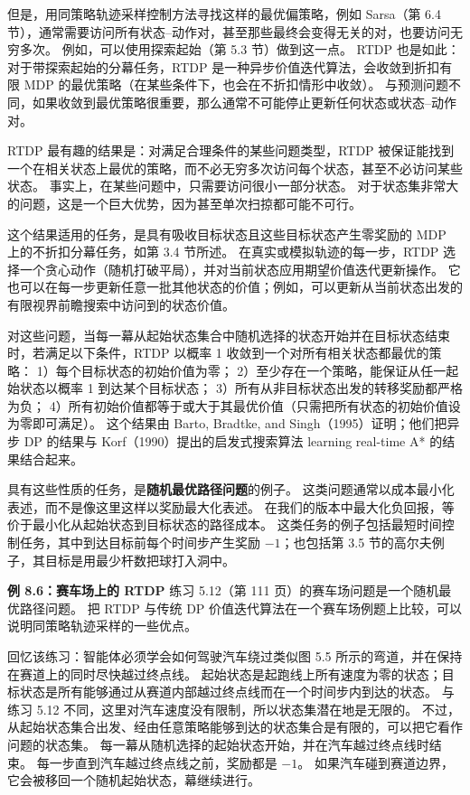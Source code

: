 \documentclass[UTF8, 12pt, fontset=fandol, oneside]{ctexart}
\begin{document}
但是，用同策略轨迹采样控制方法寻找这样的最优偏策略，例如 Sarsa（第 6.4 节），通常需要访问所有状态--动作对，甚至那些最终会变得无关的对，也要访问无穷多次。
例如，可以使用探索起始（第 5.3 节）做到这一点。
RTDP 也是如此：对于带探索起始的分幕任务，RTDP 是一种异步价值迭代算法，会收敛到折扣有限 MDP 的最优策略（在某些条件下，也会在不折扣情形中收敛）。
与预测问题不同，如果收敛到最优策略很重要，那么通常不可能停止更新任何状态或状态--动作对。

RTDP 最有趣的结果是：对满足合理条件的某些问题类型，RTDP 被保证能找到一个在相关状态上最优的策略，而不必无穷多次访问每个状态，甚至不必访问某些状态。
事实上，在某些问题中，只需要访问很小一部分状态。
对于状态集非常大的问题，这是一个巨大优势，因为甚至单次扫掠都可能不可行。

这个结果适用的任务，是具有吸收目标状态且这些目标状态产生零奖励的 MDP 上的不折扣分幕任务，如第 3.4 节所述。
在真实或模拟轨迹的每一步，RTDP 选择一个贪心动作（随机打破平局），并对当前状态应用期望价值迭代更新操作。
它也可以在每一步更新任意一批其他状态的价值；例如，可以更新从当前状态出发的有限视界前瞻搜索中访问到的状态价值。

对这些问题，当每一幕从起始状态集合中随机选择的状态开始并在目标状态结束时，若满足以下条件，RTDP 以概率 1 收敛到一个对所有相关状态都最优的策略：
1）每个目标状态的初始价值为零；
2）至少存在一个策略，能保证从任一起始状态以概率 1 到达某个目标状态；
3）所有从非目标状态出发的转移奖励都严格为负；
4）所有初始价值都等于或大于其最优价值（只需把所有状态的初始价值设为零即可满足）。
这个结果由 Barto, Bradtke, and Singh（1995）证明；他们把异步 DP 的结果与 Korf（1990）提出的启发式搜索算法 learning real-time A* 的结果结合起来。

具有这些性质的任务，是\textbf{随机最优路径问题}的例子。
这类问题通常以成本最小化表述，而不是像这里这样以奖励最大化表述。
在我们的版本中最大化负回报，等价于最小化从起始状态到目标状态的路径成本。
这类任务的例子包括最短时间控制任务，其中到达目标前每个时间步产生奖励 $-1$；也包括第 3.5 节的高尔夫例子，其目标是用最少杆数把球打入洞中。

\noindent\textbf{例 8.6：赛车场上的 RTDP}
练习 5.12（第 111 页）的赛车场问题是一个随机最优路径问题。
把 RTDP 与传统 DP 价值迭代算法在一个赛车场例题上比较，可以说明同策略轨迹采样的一些优点。

回忆该练习：智能体必须学会如何驾驶汽车绕过类似图 5.5 所示的弯道，并在保持在赛道上的同时尽快越过终点线。
起始状态是起跑线上所有速度为零的状态；目标状态是所有能够通过从赛道内部越过终点线而在一个时间步内到达的状态。
与练习 5.12 不同，这里对汽车速度没有限制，所以状态集潜在地是无限的。
不过，从起始状态集合出发、经由任意策略能够到达的状态集合是有限的，可以把它看作问题的状态集。
每一幕从随机选择的起始状态开始，并在汽车越过终点线时结束。
每一步直到汽车越过终点线之前，奖励都是 $-1$。
如果汽车碰到赛道边界，它会被移回一个随机起始状态，幕继续进行。
\end{document}
